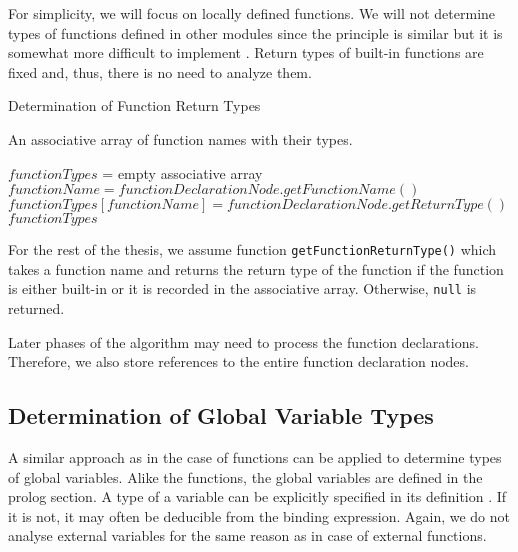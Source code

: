 For simplicity, we will focus on locally defined functions. We will not determine types of functions defined in other modules since the principle is similar but it is somewhat more difficult to implement . Return types of built-in functions are fixed and, thus, there is no need to analyze them.

\begin{algorithm}
\caption{Determination of Function Return Types}
\label{ALG_determination_of_function_return_types}
\begin{algorithmic}[1]
\ENSURE An associative array of function names with their types.

\STATE $functionTypes$ = empty associative array
    \STATE $functionName = functionDeclarationNode.getFunctionName()$
    \STATE $functionTypes[functionName] = functionDeclarationNode.getReturnType()$
\ENDFOR
\RETURN $functionTypes$
\end{algorithmic}
\end{algorithm}

For the rest of the thesis, we assume function  \texttt{getFunctionReturnType()} which takes a function name and returns the return type of the function if the function is either built-in or it is recorded in the associative array. Otherwise, \texttt{null} is returned.

Later phases of the algorithm may need to process the function declarations. Therefore, we also store references to the entire function declaration nodes.

\subsection{Determination of Global Variable Types}
A similar approach as in the case of functions can be applied to determine types of global variables. Alike the functions, the global variables are defined in the prolog section. A type of a variable can be explicitly specified in its definition . If it is not, it may often be deducible from the binding expression. Again, we do not analyse external variables for the same reason as in case of external functions.

